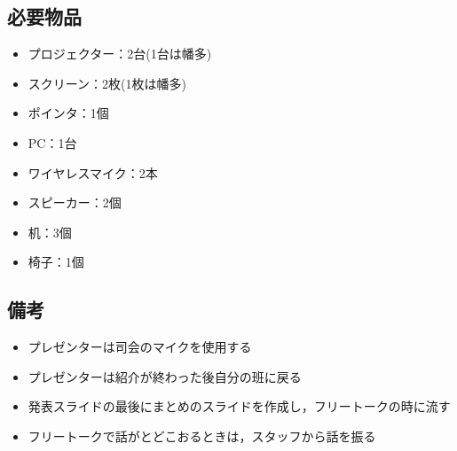 \documentclass[a4j,titlepage]{jarticle}
\begin{document}
\subsection{必要物品}
 \begin{itemize}
 \item プロジェクター：2台(1台は幡多)
 \item スクリーン：2枚(1枚は幡多)
 \item ポインタ：1個
 \item PC：1台
 \item ワイヤレスマイク：2本
 \item スピーカー：2個
 \item 机：3個
 \item 椅子：1個
 \end{itemize}

\subsection{備考}
 \begin{itemize}
 \item プレゼンターは司会のマイクを使用する
 \item プレゼンターは紹介が終わった後自分の班に戻る
 \item 発表スライドの最後にまとめのスライドを作成し，フリートークの時に流す
 \item フリートークで話がとどこおるときは，スタッフから話を振る
 \end{itemize}

%
\end{document}
